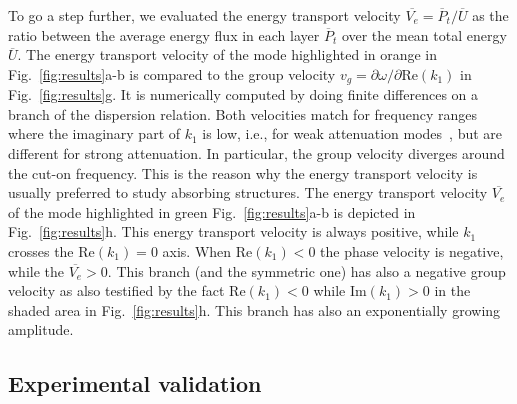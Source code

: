     To go a step further, we evaluated the energy transport velocity $\overline{V_e} = \overline{P}_t / \overline U$ as the ratio between the average energy flux in each layer  $\overline{P}_t$ over the mean total energy $\overline U$. The energy transport velocity of the mode highlighted in orange in Fig.~\ref{fig:results}a-b is compared to the group velocity $v_g=\partial \omega/\partial \textrm{Re}\left(k_1 \right)$\cite{brillouin1946} in Fig.~\ref{fig:results}g. It is numerically computed by doing finite differences on a branch of the dispersion relation. Both velocities match for frequency ranges where the imaginary part of $ k_1$ is low, i.e., for weak attenuation modes~\cite{bernard2001,simonetti2005,castaings2003,carcione1996}, but are different for strong attenuation. In particular, the group velocity diverges around the cut-on frequency. This is the reason why the energy transport velocity is usually preferred to study absorbing structures. The energy transport velocity $\overline{V_e}$ of the mode highlighted in green Fig.~\ref{fig:results}a-b is depicted in Fig.~\ref{fig:results}h. This energy transport velocity is always positive, while $ k_1$ crosses the $\textrm{Re}\left(k_1 \right)=0$ axis. When 
    $\textrm{Re}\left(k_1 \right)<0$ the phase velocity is negative, while the $\overline{V_e}>0$. This branch (and the symmetric one) has also a negative group velocity as also testified by the fact $\textrm{Re}\left(k_1 \right)<0$ while $\textrm{Im}\left(k_1 \right)>0$  in the shaded area in Fig.~\ref{fig:results}h. This branch has also an exponentially growing amplitude.
    

    \subsection{Experimental validation}

